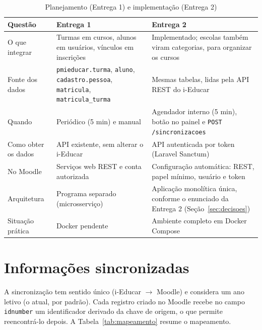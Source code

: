 \documentclass[12pt]{article}
\newcommand{\cod}[1]{\texttt{#1}}
\begin{document}
\begin{table}[H]
\centering
\caption{Planejamento (Entrega 1) e implementação (Entrega 2)}
\label{tab:entrega1}
\footnotesize
\begin{tabularx}{\linewidth}{>{\raggedright\arraybackslash}p{3.3cm}>{\raggedright\arraybackslash}X>{\raggedright\arraybackslash}X}
\toprule
\textbf{Questão} & \textbf{Entrega 1} & \textbf{Entrega 2} \\
\midrule
O que integrar & Turmas em cursos, alunos em usuários, vínculos em inscrições & Implementado; escolas também viram categorias, para organizar os cursos \\
Fonte dos dados & \cod{pmieducar.turma}, \cod{aluno}, \cod{cadastro.pessoa}, \cod{matricula}, \cod{matricula\_turma} & Mesmas tabelas, lidas pela API REST do i-Educar \\
Quando & Periódico (5 min) e manual & Agendador interno (5 min), botão no painel e \cod{POST /sincronizacoes} \\
Como obter os dados & API existente, sem alterar o i-Educar & API autenticada por token (Laravel Sanctum) \\
No Moodle & Serviços web REST e conta autorizada & Configuração automática: REST, papel mínimo, usuário e token \\
Arquitetura & Programa separado (microsserviço) & Aplicação monolítica única, conforme o enunciado da Entrega 2 (Seção~\ref{sec:decisoes}) \\
Situação prática & Docker pendente & Ambiente completo em Docker Compose \\
\bottomrule
\end{tabularx}
\end{table}

\section{Informações sincronizadas}
\label{sec:dados}

A sincronização tem sentido único (i-Educar $\rightarrow$ Moodle) e considera
um ano letivo (o atual, por padrão). Cada registro criado no Moodle recebe no
campo \cod{idnumber} um identificador derivado da chave de origem, o que
permite reencontrá-lo depois. A Tabela~\ref{tab:mapeamento} resume o
mapeamento.
\end{document}
